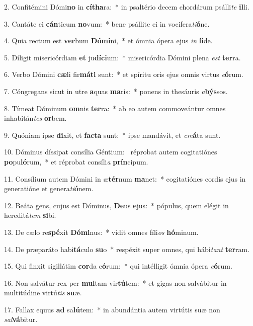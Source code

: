 2. Confitémini Dómi\textbf{no} in \textbf{cí}\textbf{tha}ra:~*  in psaltério decem chordárum psálli\textit{te} \textbf{il}li.\

3. Cantáte ei \textbf{cán}ticum \textbf{no}vum:~*  bene psállite ei in vocifera\textit{ti}\textbf{ó}ne.\

4. Quia rectum est \textbf{ver}bum \textbf{Dó}\textbf{mi}ni,~*  et ómnia ópera ejus \textit{in} \textbf{fi}de.\

5. Díligit misericórdiam \textbf{et} ju\textbf{dí}\textbf{ci}um:~*  misericórdia Dómini plena \textit{est} \textbf{ter}ra.\

6. Verbo Dómini \textbf{cæ}li fir\textbf{má}\textbf{ti} sunt:~*  et spíritu oris ejus omnis virtus \textit{e}\textbf{ó}rum.\

7. Cóngregans sicut in utre \textbf{a}quas \textbf{ma}ris:~*  ponens in thesáuris \textit{a}\textbf{býs}sos.\

8. Tímeat Dóminum \textbf{om}nis \textbf{ter}ra:~*  ab eo autem commoveántur omnes inhabitán\textit{tes} \textbf{or}bem.\

9. Quóniam ipse \textbf{di}xit, et \textbf{fac}\textbf{ta} sunt:~*  ipse mandávit, et \textit{cre}\textbf{á}ta sunt.\

10. Dóminus díssipat consília Géntium: \dag\  réprobat autem cogitatiónes \textbf{po}pu\textbf{ló}rum,~*  et réprobat consíli\textit{a} \textbf{prín}cipum.\

11. Consílium autem Dómini in æ\textbf{tér}num \textbf{ma}net:~*  cogitatiónes cordis ejus in generatióne et genera\textit{ti}\textbf{ó}nem.\

12. Beáta gens, cujus est Dóminus, \textbf{De}us \textbf{e}jus:~*  pópulus, quem elégit in hereditá\textit{tem} \textbf{si}bi.\

13. De cælo re\textbf{spé}xit \textbf{Dó}\textbf{mi}nus:~*  vidit omnes fíli\textit{os} \textbf{hó}minum.\

14. De præparáto habi\textbf{tá}culo \textbf{su}o~*  respéxit super omnes, qui hábi\textit{tant} \textbf{ter}ram.\

15. Qui finxit sigillátim \textbf{cor}da e\textbf{ó}rum:~*  qui intélligit ómnia ópera \textit{e}\textbf{ó}rum.\

16. Non salvátur rex per \textbf{mul}tam vir\textbf{tú}tem:~*  et gigas non salvábitur in multitúdine virtú\textit{tis} \textbf{su}æ.\

17. Fallax equus \textbf{ad} sa\textbf{lú}tem:~*  in abundántia autem virtútis suæ non \textit{sal}\textbf{vá}bitur.\

